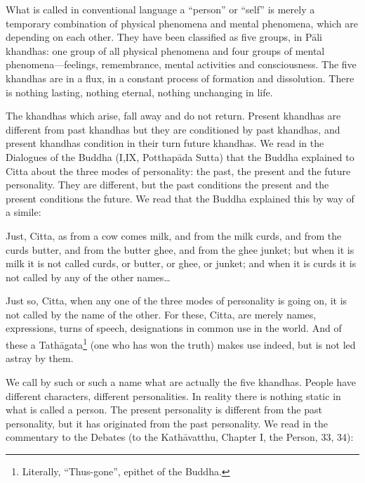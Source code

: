 \documentclass{book}
\begin{document}
What is called in conventional language a ``person'' or ``self'' is
merely a temporary combination of physical phenomena and mental
phenomena, which are depending on each other. They have been classified
as five groups, in Pāli khandhas: one group of all physical phenomena
and four groups of mental phenomena---feelings, remembrance, mental
activities and consciousness. The five khandhas are in a flux, in a
constant process of formation and dissolution. There is nothing lasting,
nothing eternal, nothing unchanging in life.

The khandhas which arise, fall away and do not return. Present khandhas
are different from past khandhas but they are conditioned by past
khandhas, and present khandhas condition in their turn future khandhas.
We read in the Dialogues of the Buddha (I,IX, Potthapāda Sutta)
that the Buddha explained to Citta about the three modes of personality:
the past, the present and the future personality. They are different,
but the past conditions the present and the present conditions the
future. We read that the Buddha explained this by way of a simile:

Just, Citta, as from a cow comes milk, and from the milk curds, and from
the curds butter, and from the butter ghee, and from the ghee junket;
but when it is milk it is not called curds, or butter, or ghee, or
junket; and when it is curds it is not called by any of the other
names\ldots{}

Just so, Citta, when any one of the three modes of personality is going
on, it is not called by the name of the other. For these, Citta, are
merely names, expressions, turns of speech, designations in common use
in the world. And of these a Tathāgata\footnote{Literally, ``Thus-gone'',
  epithet of the Buddha.} (one who has won the truth) makes use indeed,
but is not led astray by them.

We call by such or such a name what are actually the five khandhas.
People have different characters, different per­son­ali­ties. In reality
there is nothing static in what is called a person. The present
personality is different from the past personality, but it has
originated from the past personality. We read in the commentary to the
Debates (to the Kathāvatthu, Chapter I, the Person, 33, 34):
\end{document}
